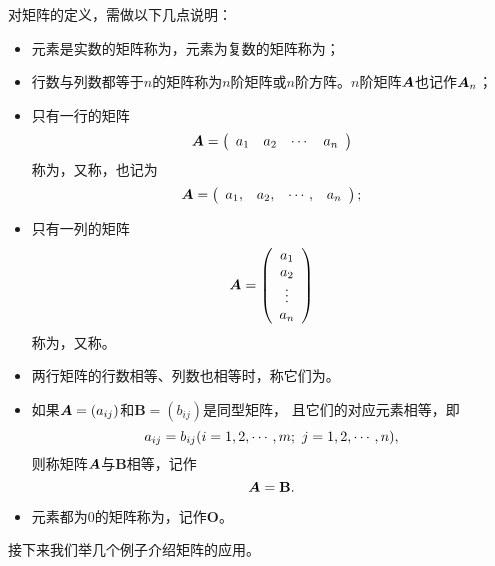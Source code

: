 \begin{zhu}
  对矩阵的定义，需做以下几点说明：
  \begin{itemize}
  \item 
    元素是实数的矩阵称为，元素为复数的矩阵称为；
  \item
    行数与列数都等于$n$的矩阵称为$n$阶矩阵或$n$阶方阵。$n$阶矩阵$\boldsymbol{A}$也记作$\boldsymbol{A}_n$；
  \item
    只有一行的矩阵
    $$
    \boldsymbol{A} = \left(
      \begin{array}{cccc}
        a_1 & a_2 & \cdots & a_n
      \end{array}
    \right )
    $$
    称为，又称，也记为
    $$
    \boldsymbol{A} = \left(
      \begin{array}{cccc}
        a_1, & a_2, & \cdots, & a_n
      \end{array}
    \right );
    $$
  \item
    只有一列的矩阵
    $$
    \boldsymbol{A} = \left(
      \begin{array}{c}
        a_1 \\
        a_2 \\
        \vdots \\
        a_n
      \end{array}
    \right )
    $$
    称为，又称。
  \item 
    两行矩阵的行数相等、列数也相等时，称它们为。
  \item
    如果$\boldsymbol{A}=(a_{ij})$和$\mathbf{B}=(b_{ij})$是同型矩阵，
    且它们的对应元素相等，即
    $$
    a_{ij} = b_{ij}(i=1,2,\cdots,m; \ j =1,2,\cdots,n),
    $$
    则称矩阵$\boldsymbol{A}$与$\mathbf{B}$相等，记作
    $$
    \boldsymbol{A} = \mathbf{B}.
    $$
  \item
    元素都为0的矩阵称为，记作{$\mathbf{O}$}。
  \end{itemize}
\end{zhu}
\vspace{.1in} \noindent
接下来我们举几个例子介绍矩阵的应用。
